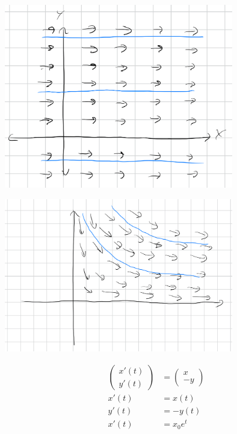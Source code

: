 \documentclass[8pt]{extarticle}
\begin{document}
  \begin{problem}{17.4}
    \begin{description}[font=\normalfont]
      \item[2:]\hfill
        \begin{center}
          \includegraphics[width=10cm]{images/17_4_2.png}
        \end{center}
      \item[6:] \hfill
        \begin{center}
          \includegraphics[width=10cm]{images/17_4_6.png}
        \end{center}
    \begin{align*}
      \begin{pmatrix}x'(t)\\y'(t)\end{pmatrix} &= \begin{pmatrix}x\\-y\end{pmatrix}\\
      x'(t) &= x(t)\\
      y'(t) &= -y(t)\\
      x'(t) &= x_0e^{t}\\

\end{align*}
\end{description}
\end{problem}
\end{document}
